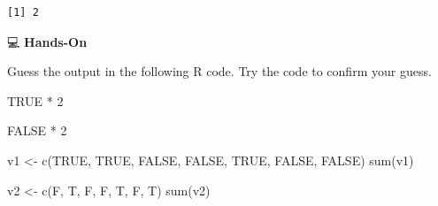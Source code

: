 \documentclass[
  letterpaper,
  DIV=11,
  numbers=noendperiod]{scrreprt}
\newenvironment{Shaded}{\begin{snugshade}}{\end{snugshade}}
\newcommand{\ConstantTok}[1]{\textcolor[rgb]{0.56,0.35,0.01}{#1}}
\newcommand{\DecValTok}[1]{\textcolor[rgb]{0.68,0.00,0.00}{#1}}
\newcommand{\FunctionTok}[1]{\textcolor[rgb]{0.28,0.35,0.67}{#1}}
\newcommand{\NormalTok}[1]{\textcolor[rgb]{0.00,0.23,0.31}{#1}}
\newcommand{\OtherTok}[1]{\textcolor[rgb]{0.00,0.23,0.31}{#1}}
\newcommand{\SpecialCharTok}[1]{\textcolor[rgb]{0.37,0.37,0.37}{#1}}
\begin{document}
\begin{verbatim}
[1] 2
\end{verbatim}

💻 \textbf{Hands-On}

Guess the output in the following R code. Try the code to confirm your
guess.

\begin{Shaded}
\begin{Highlighting}[]
\ConstantTok{TRUE} \SpecialCharTok{*} \DecValTok{2}

\ConstantTok{FALSE} \SpecialCharTok{*} \DecValTok{2}

\NormalTok{v1 }\OtherTok{\textless{}{-}} \FunctionTok{c}\NormalTok{(}\ConstantTok{TRUE}\NormalTok{, }\ConstantTok{TRUE}\NormalTok{, }\ConstantTok{FALSE}\NormalTok{, }\ConstantTok{FALSE}\NormalTok{, }\ConstantTok{TRUE}\NormalTok{, }\ConstantTok{FALSE}\NormalTok{, }\ConstantTok{FALSE}\NormalTok{)}
\FunctionTok{sum}\NormalTok{(v1)}

\NormalTok{v2 }\OtherTok{\textless{}{-}} \FunctionTok{c}\NormalTok{(F, T, F, F, T, F, T)}
\FunctionTok{sum}\NormalTok{(v2)}
\end{Highlighting}
\end{Shaded}
\end{document}
